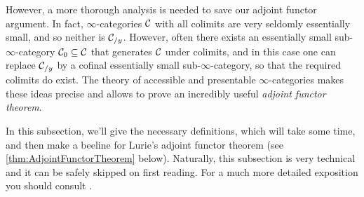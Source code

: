 However, a more thorough analysis is needed to save our adjoint functor argument. In fact, $\infty$-categories $\mathcal{C}$ with all colimits are very seldomly essentially small, and so neither is $\mathcal{C}_{/y}$. However, often there exists an essentially small sub-$\infty$-category $\mathcal{C}_0\subseteq\mathcal{C}$ that generates $\mathcal{C}$ under colimits, and in this case one can replace $\mathcal{C}_{/y}$ by a cofinal essentially small sub-$\infty$-category, so that the required colimits do exist. The theory of accessible and presentable $\infty$-categories makes these ideas precise and allows to prove an incredibly useful \emph{adjoint functor theorem}.

In this subsection, we'll give the necessary definitions, which will take some time, and then make a beeline for Lurie's adjoint functor theorem (see \cref{thm:AdjointFunctorTheorem} below). Naturally, this subsection is very technical and it can be safely skipped on first reading. For a much more detailed exposition you should consult \cite[\S\href{https://people.math.harvard.edu/~lurie/papers/HTT.pdf\#page=332}{5}]{HTT}. 

